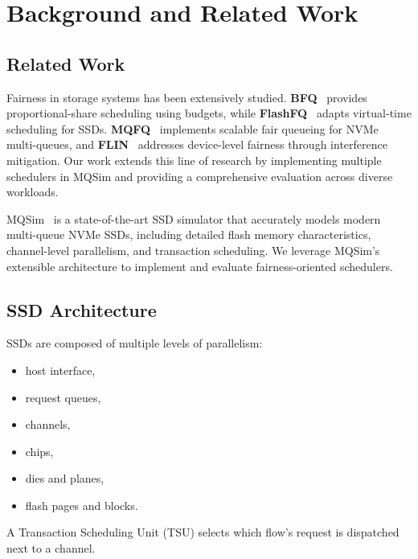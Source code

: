\documentclass[11pt]{article}
\begin{document}
\section{Background and Related Work}

\subsection{Related Work}

Fairness in storage systems has been extensively studied. \textbf{BFQ}~\cite{bfq} provides proportional-share scheduling using budgets, while \textbf{FlashFQ}~\cite{flashfq} adapts virtual-time scheduling for SSDs. \textbf{MQFQ}~\cite{mqfq} implements scalable fair queueing for NVMe multi-queues, and \textbf{FLIN}~\cite{flin} addresses device-level fairness through interference mitigation. Our work extends this line of research by implementing multiple schedulers in MQSim and providing a comprehensive evaluation across diverse workloads.

MQSim~\cite{mqsim} is a state-of-the-art SSD simulator that accurately models modern multi-queue NVMe SSDs, including detailed flash memory characteristics, channel-level parallelism, and transaction scheduling. We leverage MQSim's extensible architecture to implement and evaluate fairness-oriented schedulers.

\subsection{SSD Architecture}
SSDs are composed of multiple levels of parallelism:
\begin{itemize}
    \item host interface,
    \item request queues,
    \item channels,
    \item chips,
    \item dies and planes,
    \item flash pages and blocks.
\end{itemize}
A Transaction Scheduling Unit (TSU) selects which flow’s request is dispatched next to a channel.
\end{document}
